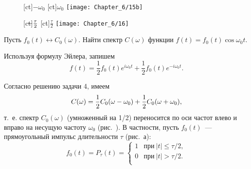 

%

\begin{figure}[h!]
	[ct]{$-\omega_0$}
	[ct]{$\omega_0$}
	\texttt{[image: Chapter\_6/15b]}
	\caption{}
\end{figure}
\begin{figure}[h!]
	[ct]{$\llap{$-$}\frac{\tau}{2}$}
	[ct]{$\frac{\tau}{2}$}
	\texttt{[image: Chapter\_6/16]}
	\caption{}
\end{figure}

 Пусть $f_0(t)\leftrightarrow C_0(\omega)$. Найти спектр $C(\omega)$ функции $f(t)=f_0(t)\cos\omega_0t$.

Используя формулу Эйлера, запишем
\begin{equation*}
	f(t)=\frac{1}{2}f_0(t)e^{i\omega_0t}+\frac{1}{2}f_0(t)e^{-i\omega_0t}.
\end{equation*}

Согласно решению задачи 4, имеем
\begin{equation}
	\eqmark{6.19}
	C(\omega)=\frac{1}{2}C_0(\omega-\omega_0)+\frac{1}{2}C_0(\omega+\omega_0),
\end{equation}
т.~е. спектр $C_0(\omega)$ (умноженный на 1/2) переносится по оси частот влево и вправо на несущую частоту $\omega_0$
(рис.~). В частности, пусть $f_0(t)$~--- прямоугольный импульс длительности $\tau$ (рис.~а):
\begin{equation*}
	f_0(t)=P_{\tau}(t)=
	\begin{cases}
		1 & \text{при}~|t|\le\tau/2,\\
		0 & \text{при}~|t|>\tau/2.\\
	\end{cases}
\end{equation*}

